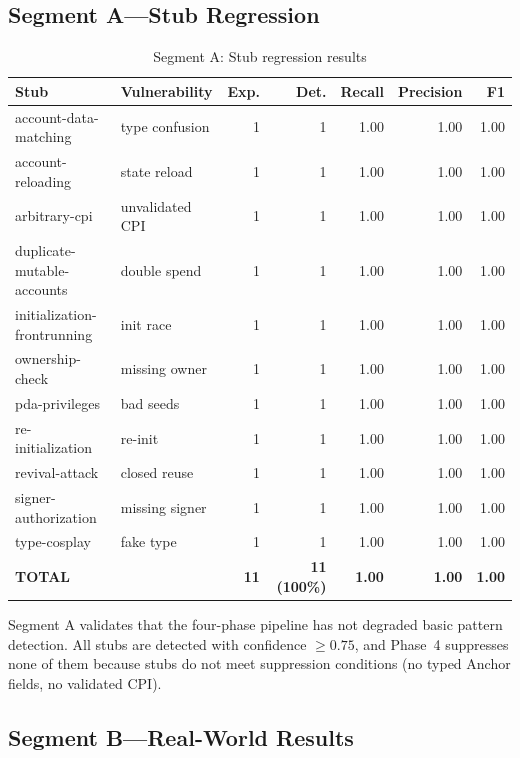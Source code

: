 \documentclass{article}
\begin{document}
\subsection{Segment A---Stub Regression}

\begin{table}[H]
  \caption{Segment A: Stub regression results}
  \label{tab:seg_a}
  \centering
  \begin{tabular}{llrrrrr}
    \toprule
    Stub & Vulnerability & Exp. & Det. & Recall & Precision & F1 \\
    \midrule
    account-data-matching & type confusion & 1 & 1 & 1.00 & 1.00 & 1.00 \\
    account-reloading & state reload & 1 & 1 & 1.00 & 1.00 & 1.00 \\
    arbitrary-cpi & unvalidated CPI & 1 & 1 & 1.00 & 1.00 & 1.00 \\
    duplicate-mutable-accounts & double spend & 1 & 1 & 1.00 & 1.00 & 1.00 \\
    initialization-frontrunning & init race & 1 & 1 & 1.00 & 1.00 & 1.00 \\
    ownership-check & missing owner & 1 & 1 & 1.00 & 1.00 & 1.00 \\
    pda-privileges & bad seeds & 1 & 1 & 1.00 & 1.00 & 1.00 \\
    re-initialization & re-init & 1 & 1 & 1.00 & 1.00 & 1.00 \\
    revival-attack & closed reuse & 1 & 1 & 1.00 & 1.00 & 1.00 \\
    signer-authorization & missing signer & 1 & 1 & 1.00 & 1.00 & 1.00 \\
    type-cosplay & fake type & 1 & 1 & 1.00 & 1.00 & 1.00 \\
    \midrule
    \textbf{TOTAL} & & \textbf{11} & \textbf{11 (100\%)} & \textbf{1.00} & \textbf{1.00} & \textbf{1.00} \\
    \bottomrule
  \end{tabular}
\end{table}

Segment A validates that the four-phase pipeline has not degraded basic pattern detection. All stubs are detected with confidence $\geq0.75$, and Phase~4 suppresses none of them because stubs do not meet suppression conditions (no typed Anchor fields, no validated CPI).

\subsection{Segment B---Real-World Results}
\end{document}
